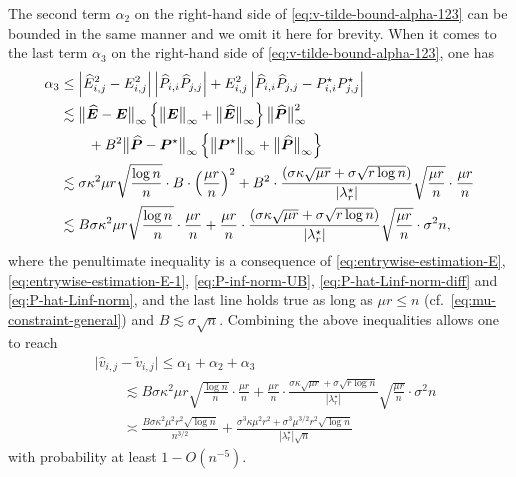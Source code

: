 The second term $\alpha_2$ on the right-hand side of \eqref{eq:v-tilde-bound-alpha-123} can be bounded in the same manner and we omit it here for brevity. 
When it comes to the last term $\alpha_3$ on the right-hand side of \eqref{eq:v-tilde-bound-alpha-123}, one has
%
\begin{align*}
\alpha_{3} & \leq\left|\widehat{E}_{i,j}^{2}-E_{i,j}^{2}\right|\left|\widehat{P}_{i,i}\widehat{P}_{j,j}\right|+ E_{i,j}^{2} \left|\widehat{P}_{i,i}\widehat{P}_{j,j}-P_{i,i}^\star P_{j,j}^\star \right|\\
 & \lesssim\big\|\widehat{\bm{E}}-\bm{E}\big\|_{\infty}\left\{ \big\|\bm{E}\big\|_{\infty}+\big\|\widehat{\bm{E}}\big\|_{\infty}\right\} \big\|\widehat{\bm{P}}\big\|_{\infty}^{2} \notag\\
	& \qquad +B^{2}\big\|\widehat{\bm{P}}- \bm{P}^{\star} \big\|_{\infty}\left\{ \big\|\bm{P}^\star \big\|_{\infty}+\big\|\widehat{\bm{P}}\big\|_{\infty}\right\} \\
 & \lesssim\sigma\kappa^{2}\mu r\sqrt{\frac{\log n}{n}}\cdot B\cdot\left(\frac{\mu r}{n}\right)^{2}+B^{2}\cdot\frac{(\sigma\kappa\sqrt{\mu r}+\sigma\sqrt{r\log n})}{|\lambda_{r}^{\star}|}\sqrt{\frac{\mu r}{n}}\cdot\frac{\mu r}{n} \\
 & \lesssim B\sigma\kappa^{2}\mu r\sqrt{\frac{\log n}{n}}\cdot\frac{\mu r}{n}+\frac{\mu r}{n}\cdot\frac{(\sigma\kappa\sqrt{\mu r}+\sigma\sqrt{r\log n})}{|\lambda_{r}^{\star}|}\sqrt{\frac{\mu r}{n}}\cdot\sigma^{2}n, 
\end{align*}
%
where the penultimate inequality is a consequence of \eqref{eq:entrywise-estimation-E}, \eqref{eq:entrywise-estimation-E-1}, \eqref{eq:P-inf-norm-UB}, \eqref{eq:P-hat-Linf-norm-diff} and \eqref{eq:P-hat-Linf-norm},
and the last line holds true as long as $\mu r \leq n$ (cf.~\eqref{eq:mu-constraint-general}) and $B\lesssim \sigma \sqrt{n}$. 
Combining the above inequalities allows one to reach
%
\begin{align*}
 & \big| \widehat{v}_{i,j} - \widetilde{v}_{i,j} \big|  \leq\alpha_{1}+\alpha_{2}+\alpha_{3}\\
 & \qquad \lesssim  
	 B\sigma\kappa^{2}\mu r\sqrt{\frac{\log n}{n}}\cdot\frac{\mu r}{n}+\frac{\mu r}{n}\cdot\frac{\sigma\kappa\sqrt{\mu r}+\sigma\sqrt{r\log n}}{|\lambda_{r}^{\star}|}\sqrt{\frac{\mu r}{n}}\cdot\sigma^{2}n \\
 & \qquad \asymp \frac{B\sigma\kappa^{2}\mu^{2}r^{2}\sqrt{\log n}}{n^{3/2}}+\frac{\sigma^{3}\kappa\mu^{2}r^{2}+\sigma^{3}\mu^{3/2}r^{2}\sqrt{\log n}}{|\lambda_{r}^{\star}|\sqrt{n}}
\end{align*}
%
with probability at least $1-O(n^{-5})$. 




